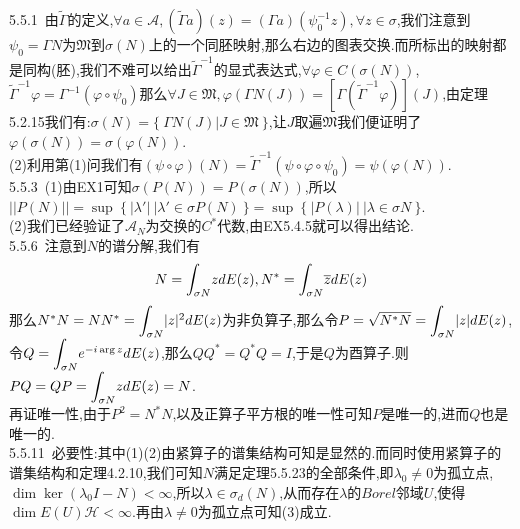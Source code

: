 \documentclass[b5paper]{ctexart}
\begin{document}
\pagestyle{plain}
\noindent
{}
\begin{wrapfigure}{r}{0pt}
\end{wrapfigure}
5.5.1~由$\tilde{\varGamma}$的定义,$\forall a\in\mathscr{A},(\tilde{\varGamma}a)(z)=(\varGamma a)(\psi_0^{-1}z),\forall z\in\sigma$,我们注意到$\psi_0=\varGamma N$为$\mathfrak{M}$到$\sigma(N)$上的一个同胚映射,那么右边的图表交换.而所标出的映射都是同构(胚),我们不难可以给出$\tilde{\varGamma}^{-1}$的显式表达式,$\forall \varphi\in C(\sigma(N))$,$\tilde{\varGamma}^{-1}\varphi=\varGamma^{-1}(\varphi\circ \psi_0)$那么$\forall J\in\mathfrak{M},\varphi(\varGamma N(J))=[\varGamma(\tilde{\varGamma}^{-1}\varphi)](J)$,由定理5.2.15我们有:$\sigma(N)=\{~\varGamma N(J)|J\in\mathfrak{M}~\}$,让$J$取遍$\mathfrak{M}$我们便证明了$\varphi(\sigma(N))=\sigma(\varphi(N))$.\\
(2)利用第(1)问我们有$(\psi\circ \varphi)(N)=\tilde{\varGamma}^{-1}(\psi\circ \varphi\circ\psi_0)=\psi(\varphi(N))$.\\
5.5.3~(1)由EX1可知$\sigma(P(N))=P(\sigma(N))$,所以\\
$||P(N)||=\sup~\{~|\lambda'|~|\lambda'\in \sigma{P(N)}~\}=\sup~\{~|P(\lambda)|~|\lambda \in \sigma{N}~\}$.\\
(2)我们已经验证了$\mathscr{A}_N$为交换的$C^*$代数,由EX5.4.5就可以得出结论.\\
5.5.6~注意到$N$的谱分解,我们有\\
\[N=\mathlarger{\int}_{\sigma{N}}zdE(z),N^*=\mathlarger{\int}_{\sigma{N}}\overline{z}dE(z)\]
那么$N^*N=NN^*=\mathlarger{\int}_{\sigma{N}}|z|^2dE(z)$为非负算子,那么令$P=\sqrt{N^*N}=\mathlarger{\int}_{\sigma{N}}|z|dE(z)$,令$Q=\mathlarger{\int}_{\sigma{N}}e^{-i\arg
 z}dE(z)$,那么$QQ^*=Q^*Q=I$,于是$Q$为酉算子.则$PQ=QP=\mathlarger{\int}_{\sigma{N}}zdE(z)=N$.\\
 再证唯一性,由于$P^2=N^*N$,以及正算子平方根的唯一性可知$P$是唯一的,进而$Q$也是唯一的.\\
5.5.11~必要性:其中(1)(2)由紧算子的谱集结构可知是显然的.而同时使用紧算子的谱集结构和定理4.2.10,我们可知$N$满足定理5.5.23的全部条件,即$\lambda_0\neq 0$为孤立点,$\dim \ker(\lambda_0I-N)<\infty$,所以$\lambda\in \sigma_{d}(N)$,从而存在$\lambda$的$Borel$邻域$U$,使得$\dim E(U)\mathscr{H}<\infty$.再由$\lambda\neq 0$为孤立点可知(3)成立.\\
\end{document}
